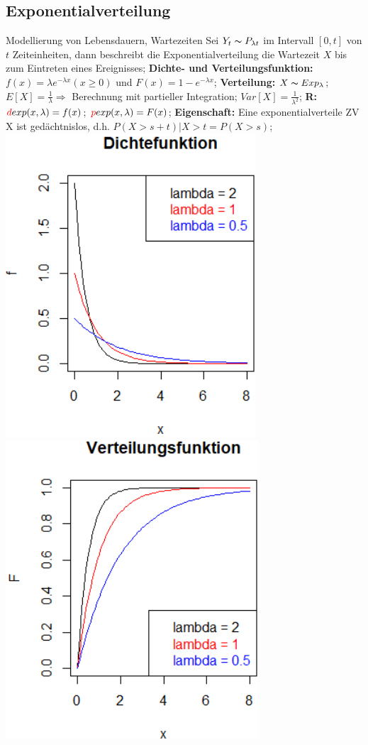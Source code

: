 \subsection{Exponentialverteilung}
Modellierung von Lebensdauern, Wartezeiten Sei $ Y_{t} \thicksim P_{\lambda t} $ im Intervall $ [0,t] $  von $ t $  Zeiteinheiten, dann beschreibt die Exponentialverteilung die Wartezeit $ X $ bis zum Eintreten eines Ereignisses; 
\textbf{Dichte- und Verteilungsfunktion:} 
$ f(x) = \lambda e^{-\lambda x} (x \ge 0) $ und 
$ F(x) = 1 - e^{-\lambda x}$; 
\textbf{Verteilung:} 
$ X \thicksim Exp_{\lambda}$; 
$ E[X] = \frac{1}{\lambda} \Rightarrow$ Berechnung mit partieller Integration; 
$ Var[X] = \frac{1}{\lambda^2}$;
\textbf{R:} 
$ \textcolor{red}{d}exp(x,\lambda) = f(x)$; 
$ \textcolor{red}{p}exp(x,\lambda) = F(x)$; 
\textbf{Eigenschaft:} 
Eine exponentialverteile ZV X ist gedächtnislos, d.h. 
$ P(X > s + t) | X > t = P( X > s)$; 
\includegraphics[scale=0.25]{./pic/ExponentialverteilungDichtefunktion.png}
\includegraphics[scale=0.25]{./pic/ExponentialverteilungVerteilungsfunktion.png}
